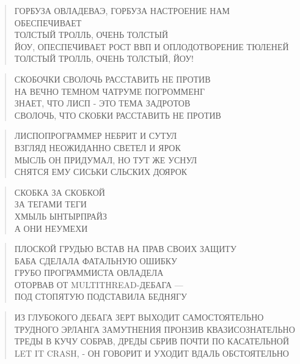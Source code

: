 \poemtitle{***}
\begin{verse}
ГОРБУЗА ОВЛАДЕВАЭ, ГОРБУЗА НАСТРОЕНИЕ НАМ ОБЕСПЕЧИВАЕТ\\
ТОЛСТЫЙ ТРОЛЛЬ, ОЧЕНЬ ТОЛСТЫЙ\\
ЙОУ, ОПЕСПЕЧИВАЕТ РОСТ ВВП И ОПЛОДОТВОРЕНИЕ ТЮЛЕНЕЙ\\
ТОЛСТЫЙ ТРОЛЛЬ, ОЧЕНЬ ТОЛСТЫЙ, ЙОУ!
\end{verse}

\poemtitle{***}
\begin{verse}
СКОБОЧКИ СВОЛОЧЬ РАССТАВИТЬ НЕ ПРОТИВ\\
НА ВЕЧНО ТЕМНОМ ЧАТРУМЕ ПОГРОММЕНГ\\
ЗНАЕТ, ЧТО ЛИСП - ЭТО ТЕМА ЗАДРОТОВ\\
СВОЛОЧЬ, ЧТО СКОБКИ РАССТАВИТЬ НЕ ПРОТИВ
\end{verse}

\poemtitle{***}
\begin{verse}
ЛИСПОПРОГРАММЕР НЕБРИТ И СУТУЛ\\
ВЗГЛЯД НЕОЖИДАННО СВЕТЕЛ И ЯРОК\\
МЫСЛЬ ОН ПРИДУМАЛ, НО ТУТ ЖЕ УСНУЛ\\
СНЯТСЯ ЕМУ СИСЬКИ СЛЬСКИХ ДОЯРОК
\end{verse}

\poemtitle{***}
\begin{verse}
СКОБКА ЗА СКОБКОЙ\\
ЗА ТЕГАМИ ТЕГИ\\
ХМЫЛЬ ЫНТЫРПРАЙЗ\\
А ОНИ НЕУМЕХИ
\end{verse}

\poemtitle{***}
\begin{verse}
ПЛОСКОЙ ГРУДЬЮ ВСТАВ НА ПРАВ СВОИХ ЗАЩИТУ\\
БАБА СДЕЛАЛА ФАТАЛЬНУЮ ОШИБКУ\\
ГРУБО ПРОГРАММИСТА ОВЛАДЕЛА\\
ОТОРВАВ ОТ MULTITHREAD-ДЕБАГА —\\
ПОД СТОПЯТУЮ ПОДСТАВИЛА БЕДНЯГУ
\end{verse}

\poemtitle{***}
\begin{verse}
ИЗ ГЛУБОКОГО ДЕБАГА ЗЕРТ ВЫХОДИТ САМОСТОЯТЕЛЬНО\\
ТРУДНОГО ЭРЛАНГА ЗАМУТНЕНИЯ ПРОНЗИВ КВАЗИСОЗНАТЕЛЬНО\\
ТРЕДЫ В КУЧУ СОБРАВ, ДРЕДЫ СБРИВ ПОЧТИ ПО КАСАТЕЛЬНОЙ\\
LET IT CRASH, - ОН ГОВОРИТ И УХОДИТ ВДАЛЬ ОБСТОЯТЕЛЬНО
\end{verse}

